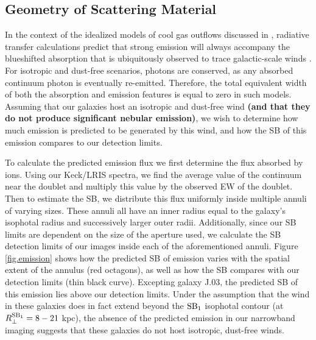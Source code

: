 \documentclass[trackchanges,twocolumn]{aastex62}
\begin{document}
\subsection{Geometry of Scattering Material}
In the context of the idealized models of cool gas outflows discussed in \cite{Prochaska_2011}, radiative transfer calculations predict that strong  emission will always accompany the blueshifted  absorption that is ubiquitously observed to trace galactic-scale winds \citep{Weiner2009,Martin2012,Rubin_2014}. For isotropic and dust-free scenarios, photons are conserved, as any absorbed continuum photon is eventually re-emitted. Therefore, the total equivalent width of both the absorption and emission features is equal to zero in such models. Assuming that our galaxies host an isotropic and dust-free wind {\bf (and that they do not produce significant nebular  emission)}, we wish to determine how much emission is predicted to be generated by this wind, and how the SB of this emission compares to our detection limits.

To calculate the predicted emission flux we first determine the flux absorbed by  ions. Using our Keck/LRIS spectra, we find the average value of the continuum near the  doublet and multiply this value by the observed EW of the doublet. Then to estimate the SB, we distribute this flux uniformly inside multiple annuli of varying sizes. These annuli all have an inner radius equal to the galaxy's isophotal radius and successively larger outer radii.  Additionally, since our SB limits are dependent on the size of the aperture used, we calculate the SB detection limits of our images inside each of the aforementioned annuli. Figure \ref{fig.emission} shows how the predicted SB of emission varies with the spatial extent of the annulus (red octagons), as well as how the SB compares with our detection limits (thin black curve). Excepting galaxy J.03, the predicted SB of this emission lies above our detection limits. 
Under the assumption that the wind in these galaxies does in fact extend beyond the $\rm SB_1$ isophotal contour (at $R_{\perp}^{\rm{SB}_1} = 8-21$ kpc), the absence of the predicted emission %
in our narrowband imaging suggests that these galaxies do not host isotropic, dust-free winds.  
\end{document}
